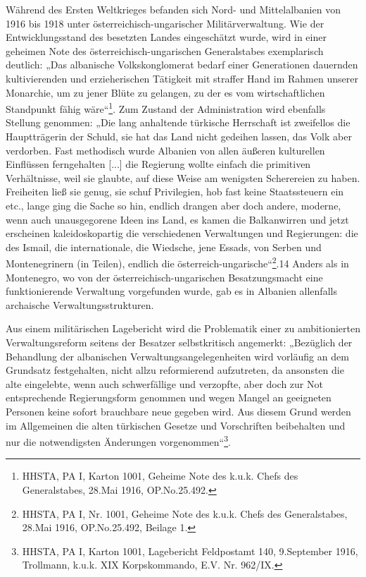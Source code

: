 Während des Ersten Weltkrieges befanden sich Nord- und Mittelalbanien von 1916 bis 1918 unter österreichisch-ungarischer Militärverwaltung. Wie der Entwicklungsstand des besetzten Landes eingeschätzt wurde, wird in einer geheimen Note des österreichisch-ungarischen Generalstabes exemplarisch deutlich: „Das albanische Volkskonglomerat bedarf einer Generationen dauernden kultivierenden und erzieherischen Tätigkeit mit straffer Hand im Rahmen unserer Monarchie, um zu jener Blüte zu gelangen, zu der es vom wirtschaftlichen Standpunkt fähig wäre“\footnote{HHSTA, PA I, Karton 1001, Geheime Note des k.u.k. Chefs des Generalstabes, 28.Mai 1916, OP.No.25.492.}. Zum Zustand der Administration wird ebenfalls Stellung genommen: „Die lang anhaltende türkische Herrschaft ist zweifellos die Hauptträgerin der Schuld, sie hat das Land nicht gedeihen lassen, das Volk aber verdorben. Fast methodisch wurde Albanien von allen äußeren kulturellen Einflüssen ferngehalten [...] die Regierung wollte einfach die primitiven Verhältnisse, weil sie glaubte, auf diese Weise am wenigsten Scherereien zu haben. Freiheiten ließ sie genug, sie schuf Privilegien, hob fast keine Staatssteuern ein etc., lange ging die Sache so hin, endlich drangen aber doch andere, moderne, wenn auch unausgegorene Ideen ins Land, es kamen die Balkanwirren und jetzt erscheinen kaleidoskopartig die verschiedenen Verwaltungen und Regierungen: die des Ismail, die internationale, die Wiedsche, jene Essads, von Serben und Montenegrinern (in Teilen), endlich die österreich-ungarische“\footnote{HHSTA, PA I, Nr. 1001, Geheime Note des k.u.k. Chefs des Generalstabes, 28.Mai 1916, OP.No.25.492, Beilage 1.}.14 Anders als in Montenegro, wo von der österreichisch-ungarischen Besatzungsmacht eine funktionierende Verwaltung vorgefunden wurde, gab es in Albanien allenfalls archaische Verwaltungsstrukturen.\par
Aus einem militärischen Lagebericht wird die Problematik einer zu ambitionierten Verwaltungsreform seitens der Besatzer selbstkritisch angemerkt: „Bezüglich der Behandlung der albanischen Verwaltungsangelegenheiten wird vorläufig an dem Grundsatz festgehalten, nicht allzu reformierend aufzutreten, da ansonsten die alte eingelebte, wenn auch schwerfällige und verzopfte, aber doch zur Not entsprechende Regierungsform genommen und wegen Mangel an geeigneten Personen keine sofort brauchbare neue gegeben wird. Aus diesem Grund werden im Allgemeinen die alten türkischen Gesetze und Vorschriften beibehalten und nur die notwendigsten Änderungen vorgenommen“\footnote{HHSTA, PA I, Karton 1001, Lagebericht Feldpostamt 140, 9.September 1916, Trollmann, k.u.k. XIX Korpskommando, E.V. Nr. 962/IX.}.\par
